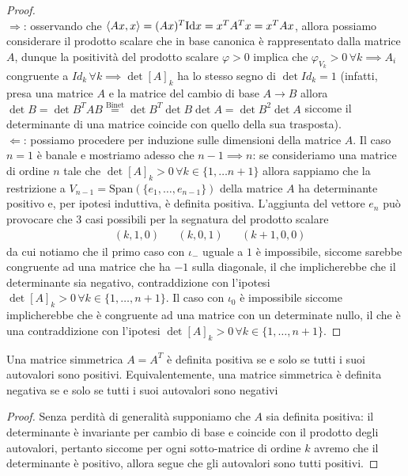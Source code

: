 \documentclass[openany, italian]{book}
\begin{document}
\begin{proof} \hspace{1cm} \\
$\boxed{\Rightarrow}$: osservando che $\langle Ax, x \rangle = (Ax)^T \text{Id} x = x^T A^T x = x^T A x$, allora possiamo considerare il prodotto scalare che in base canonica è rappresentato dalla matrice $A$, dunque la positività del prodotto scalare $\varphi > 0$ implica che $\varphi_{V_k} > 0 \, \forall k \implies A_i$ congruente a $Id_k \, \forall k \implies \det{[A]_k}$ ha lo stesso segno di $\det{Id_k} = 1$ (infatti, presa una matrice $A$ e la matrice del cambio di base $A \to B$ allora $\det{B} = \det{B^T A B} \stackrel{\text{Binet}}{=} \det{B^T}\det{B}\det{A} = \det{B}^2 \det{A}$ siccome il determinante di una matrice coincide con quello della sua trasposta). \\
$\boxed{\Leftarrow}$: possiamo procedere per induzione sulle dimensioni della matrice $A$. Il caso $n=1$ è banale e mostriamo adesso che $n-1 \implies n$: se consideriamo una matrice di ordine $n$ tale che $\det{[A]_{k}} > 0 \, \forall k \in \{1, \ldots n+1 \}$ allora sappiamo che la restrizione a $V_{n-1} = \text{Span}(\{e_1, \ldots, e_{n-1} \})$ della matrice $A$ ha determinante positivo e, per ipotesi induttiva, è definita positiva. L'aggiunta del vettore $e_n$ può provocare che $3$ casi possibili per la segnatura del prodotto scalare
\begin{align*}
&(k, 1, 0) & &(k, 0, 1) & &(k+1, 0, 0)
\end{align*}
da cui notiamo che il primo caso con $\iota_-$ uguale a $1$ è impossibile, siccome sarebbe congruente ad una matrice che ha $-1$ sulla diagonale, il che implicherebbe che il determinante sia negativo, contraddizione con l'ipotesi $\det{[A]_k} > 0 \, \forall k \in \{1, \ldots, n+1\}$. Il caso con $\iota_0$ è impossibile siccome implicherebbe che è congruente ad una matrice con un determinate nullo, il che è una contraddizione con l'ipotesi $\det{[A]_k} > 0 \, \forall k \in \{1, \ldots, n+1 \}$.
\end{proof}
\begin{cor}
Una matrice simmetrica $A=A^T$ è definita positiva se e solo se tutti i suoi autovalori sono positivi. Equivalentemente, una matrice simmetrica è definita negativa se e solo se tutti i suoi autovalori sono negativi
\end{cor}
\begin{proof}
Senza perdità di generalità supponiamo che $A$ sia definita positiva: il determinante è invariante per cambio di base e coincide con il prodotto degli autovalori, pertanto siccome per ogni sotto-matrice di ordine $k$ avremo che il determinante è positivo, allora segue che gli autovalori sono tutti positivi.
\end{proof}
\end{document}
